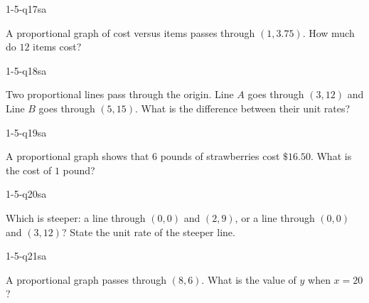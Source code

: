 \begin{practiceQuestion}{1-5-q17}{sa}
\begin{questionText}
A proportional graph of cost versus items passes through $(1, 3.75)$. How much do $12$ items cost?
\end{questionText}
\end{practiceQuestion}

\begin{practiceQuestion}{1-5-q18}{sa}
\begin{questionText}
Two proportional lines pass through the origin. Line $A$ goes through $(3, 12)$ and Line $B$ goes through $(5, 15)$. What is the difference between their unit rates?
\end{questionText}
\end{practiceQuestion}

\begin{practiceQuestion}{1-5-q19}{sa}
\begin{questionText}
A proportional graph shows that $6$ pounds of strawberries cost $\$16.50$. What is the cost of $1$ pound?
\end{questionText}
\end{practiceQuestion}

\begin{practiceQuestion}{1-5-q20}{sa}
\begin{questionText}
Which is steeper: a line through $(0, 0)$ and $(2, 9)$, or a line through $(0, 0)$ and $(3, 12)$? State the unit rate of the steeper line.
\end{questionText}
\end{practiceQuestion}

\begin{practiceQuestion}{1-5-q21}{sa}
\begin{questionText}
A proportional graph passes through $(8, 6)$. What is the value of $y$ when $x = 20$?
\end{questionText}
\end{practiceQuestion}


